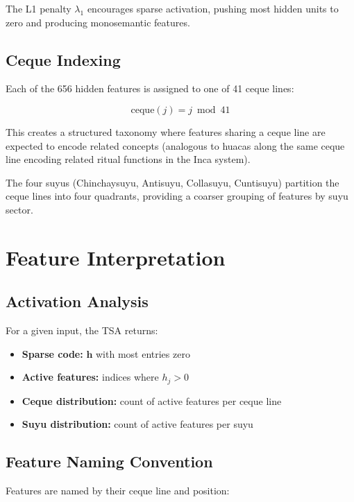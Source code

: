 \documentclass[11pt]{article}
\theoremstyle{plain}
\begin{document}
The L1 penalty \( \lambda_1 \) encourages sparse activation, pushing most hidden units to zero and producing monosemantic features.

\subsection{Ceque Indexing}

Each of the 656 hidden features is assigned to one of 41 ceque lines:

\begin{equation}
\text{ceque}(j) = j \bmod 41
\end{equation}

This creates a structured taxonomy where features sharing a ceque line are expected to encode related concepts (analogous to huacas along the same ceque line encoding related ritual functions in the Inca system).

The four suyus (Chinchaysuyu, Antisuyu, Collasuyu, Cuntisuyu) partition the ceque lines into four quadrants, providing a coarser grouping of features by suyu sector.


\section{Feature Interpretation}

\subsection{Activation Analysis}

For a given input, the TSA returns:

\begin{itemize}
  \item \textbf{Sparse code:} \( \mathbf{h} \) with most entries zero
  \item \textbf{Active features:} indices where \( h_j > 0 \)
  \item \textbf{Ceque distribution:} count of active features per ceque line
  \item \textbf{Suyu distribution:} count of active features per suyu
\end{itemize}

\subsection{Feature Naming Convention}

Features are named by their ceque line and position:
\end{document}
